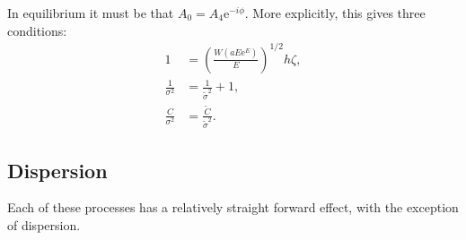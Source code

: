 In equilibrium it must be that $A_0 = A_4 \textrm{e}^{-i \phi}$. More explicitly, this gives three conditions:
\begin{subequations}
\begin{align}
\label{eq:energycond}
1 &= \left( \frac{W(a E \textrm{e}^E)}{E} \right)^{1/2} h \zeta, \\
\label{eq:varcond}
\frac{1}{\sigma^2} &= \frac{1}{\widetilde{\sigma}^2} + 1, \\
\label{eq:chirpcond}
\frac{C}{\sigma^2} &= \frac{\widetilde{C}}{\widetilde{\sigma}^2}.
\end{align}
\label{eq:linsys}
\end{subequations}

\subsection{Dispersion}
Each of these processes has a relatively straight forward effect, with the exception of dispersion.


